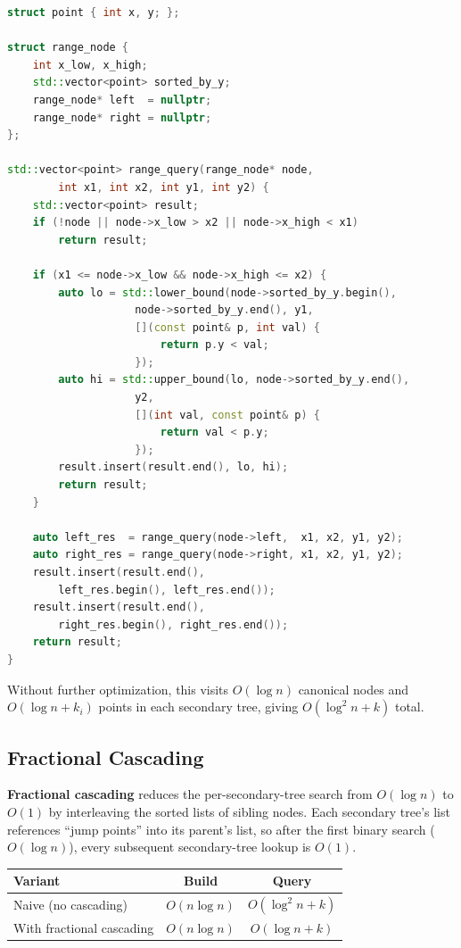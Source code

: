\begin{lstlisting}[language=C++]
struct point { int x, y; };

struct range_node {
    int x_low, x_high;
    std::vector<point> sorted_by_y;
    range_node* left  = nullptr;
    range_node* right = nullptr;
};

std::vector<point> range_query(range_node* node,
        int x1, int x2, int y1, int y2) {
    std::vector<point> result;
    if (!node || node->x_low > x2 || node->x_high < x1)
        return result;

    if (x1 <= node->x_low && node->x_high <= x2) {
        auto lo = std::lower_bound(node->sorted_by_y.begin(),
                    node->sorted_by_y.end(), y1,
                    [](const point& p, int val) {
                        return p.y < val;
                    });
        auto hi = std::upper_bound(lo, node->sorted_by_y.end(),
                    y2,
                    [](int val, const point& p) {
                        return val < p.y;
                    });
        result.insert(result.end(), lo, hi);
        return result;
    }

    auto left_res  = range_query(node->left,  x1, x2, y1, y2);
    auto right_res = range_query(node->right, x1, x2, y1, y2);
    result.insert(result.end(),
        left_res.begin(), left_res.end());
    result.insert(result.end(),
        right_res.begin(), right_res.end());
    return result;
}
\end{lstlisting}

Without further optimization, this visits $O(\log n)$ canonical nodes and $O(\log n + k_i)$ points in each secondary tree, giving $O(\log^2 n + k)$ total.

\subsection{Fractional Cascading}

\textbf{Fractional cascading} reduces the per-secondary-tree search from $O(\log n)$ to $O(1)$ by interleaving the sorted lists of sibling nodes. Each secondary tree's list references ``jump points'' into its parent's list, so after the first binary search ($O(\log n)$), every subsequent secondary-tree lookup is $O(1)$.

\begin{center}
\begin{tabular}{lcc}
\toprule
Variant & Build & Query \\
\midrule
Naive (no cascading) & $O(n \log n)$ & $O(\log^2 n + k)$ \\
With fractional cascading & $O(n \log n)$ & $O(\log n + k)$ \\
\bottomrule
\end{tabular}
\end{center}

